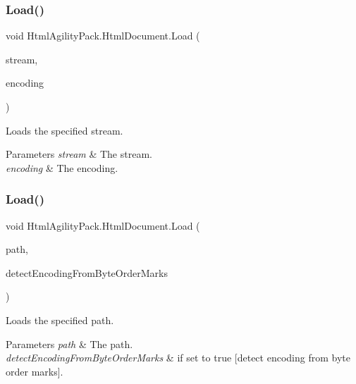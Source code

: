 \subsubsection{\texorpdfstring{Load()}{Load()}\hspace{0.1cm}{\footnotesize\ttfamily [5/11]}}
{\footnotesize\ttfamily void Html\+Agility\+Pack.\+Html\+Document.\+Load (\begin{DoxyParamCaption}\item[{Stream}]{stream,  }\item[{\hyperlink{class_html_agility_pack_1_1_html_document_a220bdf28a5e35f4898075084be2d59f0}{Encoding}}]{encoding }\end{DoxyParamCaption})\hspace{0.3cm}{\ttfamily [inline]}}



Loads the specified stream. 


\begin{DoxyParams}{Parameters}
{\em stream} & The stream.\\
\hline
{\em encoding} & The encoding.\\
\hline
\end{DoxyParams}
\mbox{\label{class_html_agility_pack_1_1_html_document_a9eb27328fa78b622b0945e15cfd8b640}} 
\subsubsection{\texorpdfstring{Load()}{Load()}\hspace{0.1cm}{\footnotesize\ttfamily [6/11]}}
{\footnotesize\ttfamily void Html\+Agility\+Pack.\+Html\+Document.\+Load (\begin{DoxyParamCaption}\item[{string}]{path,  }\item[{bool}]{detect\+Encoding\+From\+Byte\+Order\+Marks }\end{DoxyParamCaption})\hspace{0.3cm}{\ttfamily [inline]}}



Loads the specified path. 


\begin{DoxyParams}{Parameters}
{\em path} & The path.\\
\hline
{\em detect\+Encoding\+From\+Byte\+Order\+Marks} & if set to {\ttfamily true} \mbox{[}detect encoding from byte order marks\mbox{]}.\\
\hline
\end{DoxyParams}

